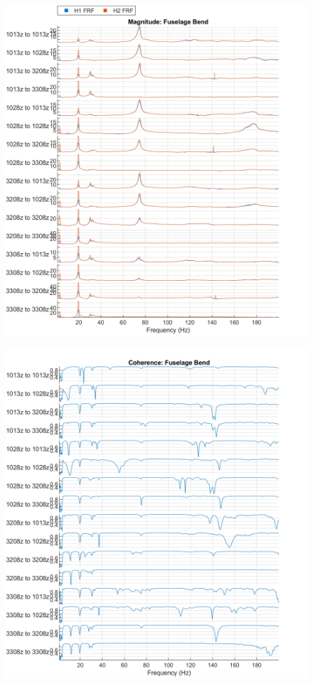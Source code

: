 \begin{figure}
    \centering
    \includegraphics{figs/GVT/mag_Fuselage Bend.png}
    \label{fig:mag_fuseBend}
\end{figure}
\begin{figure}
    \centering
    \includegraphics{figs/GVT/coh_Fuselage Bend.png}
    \label{fig:coh_fuseBend}
\end{figure}

